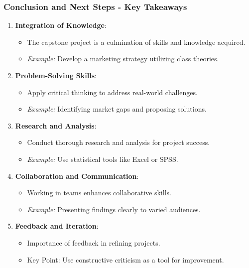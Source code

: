 \documentclass[aspectratio=169]{beamer}
\begin{document}
\begin{frame}[fragile]
    \frametitle{Conclusion and Next Steps - Key Takeaways}
    \begin{enumerate}
        \item \textbf{Integration of Knowledge}: 
        \begin{itemize}
            \item The capstone project is a culmination of skills and knowledge acquired.
            \item \textit{Example:} Develop a marketing strategy utilizing class theories.
        \end{itemize}
        
        \item \textbf{Problem-Solving Skills}: 
        \begin{itemize}
            \item Apply critical thinking to address real-world challenges.
            \item \textit{Example:} Identifying market gaps and proposing solutions.
        \end{itemize}
        
        \item \textbf{Research and Analysis}: 
        \begin{itemize}
            \item Conduct thorough research and analysis for project success.
            \item \textit{Example:} Use statistical tools like Excel or SPSS.
        \end{itemize}
        
        \item \textbf{Collaboration and Communication}: 
        \begin{itemize}
            \item Working in teams enhances collaborative skills.
            \item \textit{Example:} Presenting findings clearly to varied audiences.
        \end{itemize}
        
        \item \textbf{Feedback and Iteration}: 
        \begin{itemize}
            \item Importance of feedback in refining projects.
            \item Key Point: Use constructive criticism as a tool for improvement.
        \end{itemize}
    \end{enumerate}
\end{frame}
\end{document}
